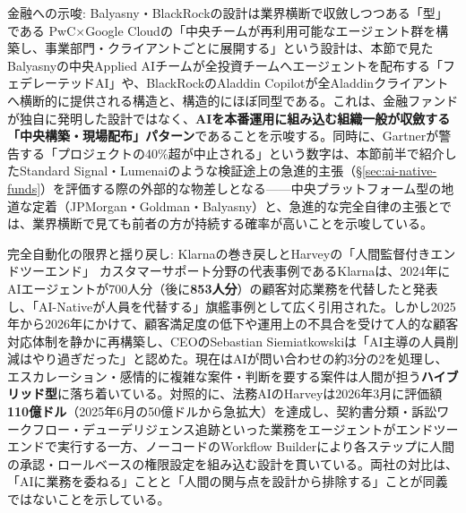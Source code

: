 \begin{insight}{金融への示唆: Balyasny・BlackRockの設計は業界横断で収斂しつつある「型」である}
PwC×Google Cloudの「中央チームが再利用可能なエージェント群を構築し、事業部門・クライアントごとに展開する」という設計は、本節で見たBalyasnyの中央Applied AIチームが全投資チームへエージェントを配布する「フェデレーテッドAI」\cite{x03balyasny_openai2026,x03balyasny_mlq2026}や、BlackRockのAladdin Copilotが全Aladdinクライアントへ横断的に提供される構造\cite{x03blackrock_aladdincopilot}と、構造的にほぼ同型である。これは、金融ファンドが独自に発明した設計ではなく、\textbf{AIを本番運用に組み込む組織一般が収斂する「中央構築・現場配布」パターン}であることを示唆する。同時に、Gartnerが警告する「プロジェクトの40\%超が中止される」という数字は、本節前半で紹介したStandard Signal・Lumenaiのような検証途上の急進的主張（\S\ref{sec:ai-native-funds}）を評価する際の外部的な物差しとなる——中央プラットフォーム型の地道な定着（JPMorgan・Goldman・Balyasny）と、急進的な完全自律の主張とでは、業界横断で見ても前者の方が持続する確率が高いことを示唆している。
\end{insight}

\begin{casestudy}{完全自動化の限界と揺り戻し: Klarnaの巻き戻しとHarveyの「人間監督付きエンドツーエンド」}
カスタマーサポート分野の代表事例であるKlarnaは、2024年にAIエージェントが700人分（後に\textbf{853人分}）の顧客対応業務を代替したと発表し、「AI-Nativeが人員を代替する」旗艦事例として広く引用された\cite{y03cxdive2025klarna853}。しかし2025年から2026年にかけて、顧客満足度の低下や運用上の不具合を受けて人的な顧客対応体制を静かに再構築し、CEOのSebastian Siemiatkowskiは「AI主導の人員削減はやり過ぎだった」と認めた。現在はAIが問い合わせの約3分の2を処理し、エスカレーション・感情的に複雑な案件・判断を要する案件は人間が担う\textbf{ハイブリッド型}に落ち着いている\cite{y03fastcompany2026klarnareversal}。対照的に、法務AIのHarveyは2026年3月に評価額\textbf{110億ドル}（2025年6月の50億ドルから急拡大）を達成し、契約書分類・訴訟ワークフロー・デューデリジェンス追跡といった業務をエージェントがエンドツーエンドで実行する一方、ノーコードのWorkflow Builderにより各ステップに人間の承認・ロールベースの権限設定を組み込む設計を貫いている\cite{y03harvey2026raise11b}。両社の対比は、「AIに業務を委ねる」ことと「人間の関与点を設計から排除する」ことが同義ではないことを示している。
\end{casestudy}


